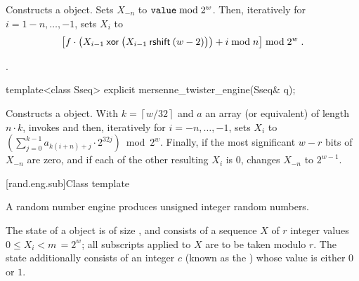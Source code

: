 \begin{itemdescr}
\pnum\effects Constructs a  object.
Sets $X_{-n}$ to $\texttt{\protect value} \bmod 2^w$.
 Then, iteratively for $i = 1\!-\!n,\ldots,-1$,
 sets $X_i$
 to
\[%
 \bigl[f \cdot
       \bigl(X_{i-1} \xor \bigl(X_{i-1} \rightshift (w-2)\bigr)
       \bigr)
       + i \bmod n
 \bigr] \bmod 2^w
\; \mbox{.}
\]%

\pnum\complexity {}.
\end{itemdescr}

%
\begin{itemdecl}
template<class Sseq> explicit mersenne_twister_engine(Sseq& q);
\end{itemdecl}

\begin{itemdescr}
\pnum\effects Constructs a  object.
 With
 $ k = \left\lceil w / 32 \right\rceil $
 and $a$ an array (or equivalent)
 of length $ n \cdot k $,
 invokes 
 and then, iteratively for $i = -n,\ldots,-1$,
 sets $X_i$
 to $ \left(\sum_{j=0}^{k-1}a_{k(i+n)+j} \cdot 2^{32j} \right) \bmod 2^w $.
 Finally,
 if the most significant $w-r$ bits of $X_{-n}$
 are zero,
 and if each of the other resulting $X_i$ is $0$,
 changes $X_{-n}$
 to $ 2^{w-1} $.
\end{itemdescr}


[rand.eng.sub]{Class template }%
%

\pnum
A  random number engine
produces unsigned integer random numbers.

\pnum
The state%
%
of a  object 
is of size
,
and consists of
a sequence $X$ of $r$ integer values $0 \leq X_i < m \,= 2^w$;
all subscripts applied to $X$ are to be taken modulo $r$.
The state 
additionally consists of an integer $c$
(known as the )%
%
whose value is either $0$ or $1$.

